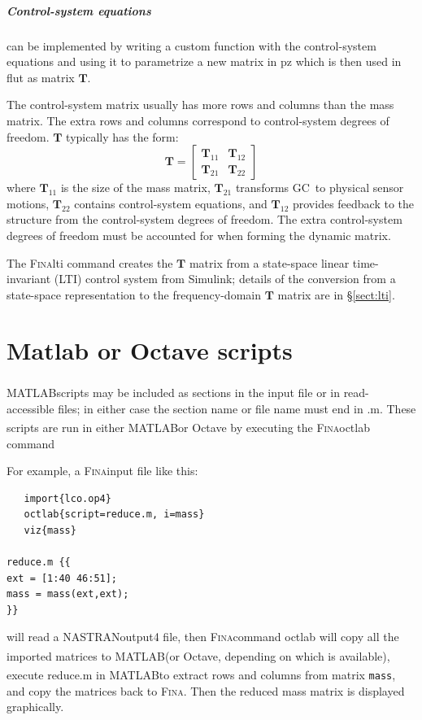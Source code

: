 \documentclass[10pt,openany,twoside]{book}
\numberwithin{equation}{section}   %
\newcommand{\Cmd}[1]{{\sf #1}}
\newcommand{\Code}[1]{{\small\tt #1}}
\newcommand{\Fina}{{\normalfont\scshape Fina\:}}
\newcommand{\Matlab}{{\footnotesize{MATLAB\textsuperscript{\textregistered}}\:}}
\newcommand{\Octlab}{\Cmd{matlab}/\Cmd{octave}\:}
\newcommand{\Nastran}{{\footnotesize{NASTRAN\:}}}
\newcommand{\Matrix}[1]{\boldsymbol{#1}}
\newcommand{\Gc}{GC}
\newcommand{\Sectref}[1]{\S\ref{#1}}
\begin{document}
\subparagraph{Control-system equations}
can be implemented by writing a custom function
with the control-system equations
and using it to parametrize a new matrix in
\Cmd{pz} which is then used in \Cmd{flut} as matrix $\Matrix{T}$.

The control-system matrix usually has more rows and columns than the
mass matrix. The extra rows and columns correspond to control-system
degrees of freedom. $\Matrix{T}$ typically has the form:
\begin{equation}
\Matrix{T} = \left[ \begin{array}{cc}
			\Matrix{T}_{11}     &   \Matrix{T}_{12} \\
	      \Matrix{T}_{21}     &   \Matrix{T}_{22}
		\end{array} \right]
\end{equation}
where $\Matrix{T}_{11}$ is the size of the mass matrix,
$\Matrix{T}_{21}$ transforms \Gc\ to physical sensor motions,
$\Matrix{T}_{22}$ contains control-system equations, and $\Matrix{T}_{12}$ provides
feedback to the structure from the control-system degrees of freedom.
The extra control-system degrees of freedom must be accounted for when
forming the dynamic matrix.
\par
The \Fina \Cmd{lti} command creates the $\Matrix{T}$ matrix
from a state-space linear time-invariant (LTI) control system from Simulink;
details of the conversion from a state-space
representation to the frequency-domain $\Matrix{T}$ matrix are in
\Sectref{sect:lti}.

\section{Matlab or Octave scripts}
\index{matlab@\Octlab!scripts}
\Matlab scripts may be included as sections in the input file or
in read-accessible files; in either case the section name or file
name must end in .m. These scripts are run in either \Matlab or
Octave by executing the \Fina \Cmd{octlab} command

For example, a \Fina input file like this:
\begin{lstlisting}
   import{lco.op4}
   octlab{script=reduce.m, i=mass}
   viz{mass}

reduce.m {{
ext = [1:40 46:51];
mass = mass(ext,ext);
}}
\end{lstlisting}
will read a \Nastran output4 file,
then \Fina command \Cmd{octlab} will copy all the imported matrices
to \Matlab (or Octave, depending on which is available), execute
reduce.m in \Matlab to extract rows and columns from matrix \Code{mass},
and copy the matrices back
to \Fina. Then the reduced mass matrix is displayed graphically.
\end{document}
